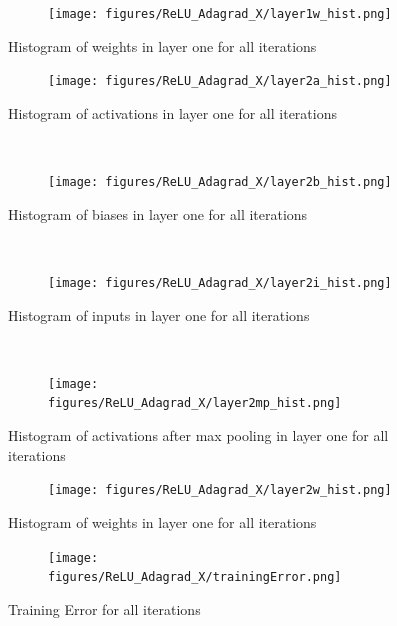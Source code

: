 \documentclass[]{article}
\begin{document}
\begin{figure}
    \centering
    \begin{subfigure}
        \centering
        \texttt{[image: figures/ReLU\_Adagrad\_X/layer1w\_hist.png]}
    \end{subfigure}%
    \caption{Histogram of weights in  layer one for all iterations}
 \label{fig:/layer1w_hist1}
\end{figure}



\begin{figure}[ht]
    \centering
    \begin{subfigure}
        \centering
        \texttt{[image: figures/ReLU\_Adagrad\_X/layer2a\_hist.png]}
    \end{subfigure}%
    \caption{Histogram of activations in layer one for all iterations}
 \label{fig:/layer2a_hist1}
    ~ 
    \centering
    \begin{subfigure}
        \centering
        \texttt{[image: figures/ReLU\_Adagrad\_X/layer2b\_hist.png]}
    \end{subfigure}%
    \caption{Histogram of biases in  layer one for all iterations}
 \label{fig:/layer2b_hist1}
    ~ 
    \centering
    \begin{subfigure}
        \centering
        \texttt{[image: figures/ReLU\_Adagrad\_X/layer2i\_hist.png]}
    \end{subfigure}%
    \caption{Histogram of  inputs in  layer one for all iterations}
 \label{fig:/layer2i_hist1}
    ~ 
    \centering
    \begin{subfigure}
        \centering
        \texttt{[image: figures/ReLU\_Adagrad\_X/layer2mp\_hist.png]}
    \end{subfigure}%
    \caption{Histogram of activations after max pooling in  layer one for all iterations}
 \label{fig:/layer2mp_hist1}
\end{figure}

\begin{figure}
    \centering
    \begin{subfigure}
        \centering
        \texttt{[image: figures/ReLU\_Adagrad\_X/layer2w\_hist.png]}
    \end{subfigure}%
    \caption{Histogram of weights in layer one for all iterations}
 \label{fig:/layer2w_hist1}
\end{figure}

\begin{figure}
    \centering
    \begin{subfigure}
        \centering
        \texttt{[image: figures/ReLU\_Adagrad\_X/trainingError.png]}
    \end{subfigure}%
    \caption{Training Error for all iterations}
 \label{fig:trainError1}
\end{figure}
\end{document}
